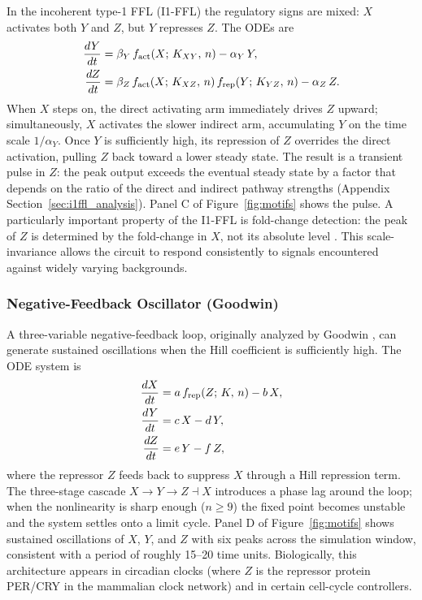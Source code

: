 In the incoherent type-1 FFL (I1-FFL) the regulatory signs are mixed: $X$
activates both $Y$ and $Z$, but $Y$ represses $Z$.  The ODEs are
\begin{align}
  \frac{dY}{dt} &= \beta_Y\,f_{\rm act}(X;\,K_{XY},\,n)
                   - \alpha_Y\,Y, \label{eq:i1ffl_Y}\\
  \frac{dZ}{dt} &= \beta_Z\,f_{\rm act}(X;\,K_{XZ},\,n)\,
                              f_{\rm rep}(Y;\,K_{YZ},\,n)
                   - \alpha_Z\,Z. \label{eq:i1ffl_Z}
\end{align}
When $X$ steps on, the direct activating arm immediately drives $Z$ upward;
simultaneously, $X$ activates the slower indirect arm, accumulating $Y$ on
the time scale $1/\alpha_Y$.  Once $Y$ is sufficiently high, its repression
of $Z$ overrides the direct activation, pulling $Z$ back toward a lower
steady state.  The result is a transient pulse in $Z$: the peak output
exceeds the eventual steady state by a factor that depends on the ratio of
the direct and indirect pathway strengths (Appendix Section~\ref{sec:i1ffl_analysis}).
Panel C of Figure~\ref{fig:motifs} shows the pulse.  A particularly important
property of the I1-FFL is fold-change detection: the peak of $Z$ is
determined by the fold-change in $X$, not its absolute level \cite{Goentoro2009}.
This scale-invariance allows the circuit to respond consistently to signals
encountered against widely varying backgrounds.

\subsubsection*{Negative-Feedback Oscillator (Goodwin)}

A three-variable negative-feedback loop, originally analyzed by Goodwin
\cite{Alon2006}, can generate sustained oscillations when the Hill coefficient
is sufficiently high.  The ODE system is
\begin{align}
  \frac{dX}{dt} &= a\,f_{\rm rep}(Z;\,K,\,n) - b\,X, \label{eq:osc_X}\\
  \frac{dY}{dt} &= c\,X - d\,Y,                       \label{eq:osc_Y}\\
  \frac{dZ}{dt} &= e\,Y - f\,Z,                       \label{eq:osc_Z}
\end{align}
where the repressor $Z$ feeds back to suppress $X$ through a Hill repression
term.  The three-stage cascade $X \to Y \to Z \dashv X$ introduces a phase
lag around the loop; when the nonlinearity is sharp enough ($n \geq 9$) the
fixed point becomes unstable and the system settles onto a limit cycle.
Panel D of Figure~\ref{fig:motifs} shows sustained oscillations of $X$, $Y$,
and $Z$ with six peaks across the simulation window, consistent with a period
of roughly 15--20 time units.  Biologically, this architecture appears in
circadian clocks (where $Z$ is the repressor protein PER/CRY in the
mammalian clock network) and in certain cell-cycle controllers.

